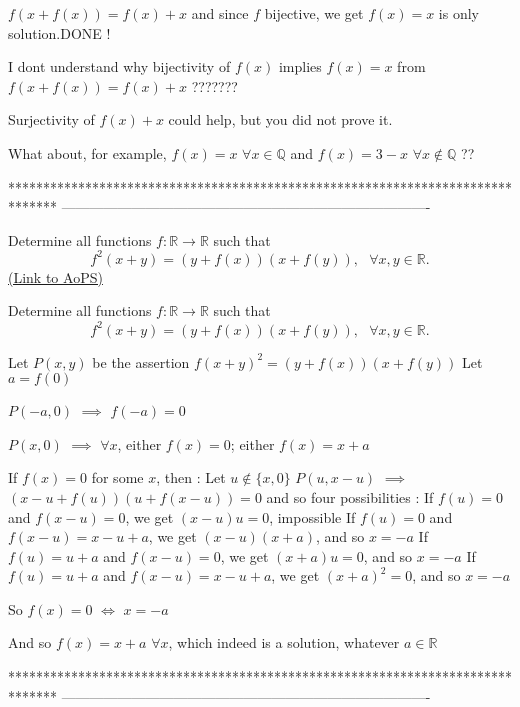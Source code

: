 \begin{solution}
	\begin{tcolorbox}$f(x+f(x))=f(x)+x $ and since $ f $ bijective, we get $ f(x)=x $ is only solution.DONE !\end{tcolorbox}

I dont understand why bijectivity of $f(x)$ implies $f(x)=x$ from $f(x+f(x))=f(x)+x $ ???????

Surjectivity of $f(x)+x$ could help, but you did not prove it.

What about, for example, $f(x)=x$ $\forall x\in\mathbb Q$ and $f(x)=3-x$ $\forall x\notin\mathbb Q$ ??
\end{solution}
*******************************************************************************
-------------------------------------------------------------------------------

\begin{problem}
	Determine all functions $f : \mathbb{R} \to \mathbb{R}$ such that \[ f^2(x+y)=(y+f(x))(x+f(y)) , \ \ \ \forall x,y \in  \mathbb{R}.  \]
	\flushright \href{https://artofproblemsolving.com/community/c6h607697}{(Link to AoPS)}
\end{problem}



\begin{solution}
	\begin{tcolorbox}Determine all functions $f : \mathbb{R} \to \mathbb{R}$ such that \[ f^2(x+y)=(y+f(x))(x+f(y)) , \ \ \ \forall x,y \in  \mathbb{R}.  \]\end{tcolorbox}
Let $P(x,y)$ be the assertion $f(x+y)^2=(y+f(x))(x+f(y))$
Let $a=f(0)$

$P(-a,0)$ $\implies$ $f(-a)=0$

$P(x,0)$ $\implies$ $\forall x$, either $f(x)=0$; either $f(x)=x+a$

If $f(x)=0$ for some $x$, then :
Let $u\notin\{x,0\}$
$P(u,x-u)$ $\implies$ $(x-u+f(u))(u+f(x-u))=0$ and so four possibilities :
If $f(u)=0$ and $f(x-u)=0$, we get $(x-u)u=0$, impossible
If $f(u)=0$ and $f(x-u)=x-u+a$, we get $(x-u)(x+a)$, and so $x=-a$
If $f(u)=u+a$ and $f(x-u)=0$, we get $(x+a)u=0$, and so $x=-a$
If $f(u)=u+a$ and $f(x-u)=x-u+a$, we get $(x+a)^2=0$, and so $x=-a$

So $f(x)=0$ $\iff$ $x=-a$

And so $\boxed{f(x)=x+a}$ $\forall x$, which indeed is a solution, whatever $a\in\mathbb R$
\end{solution}
*******************************************************************************
-------------------------------------------------------------------------------


